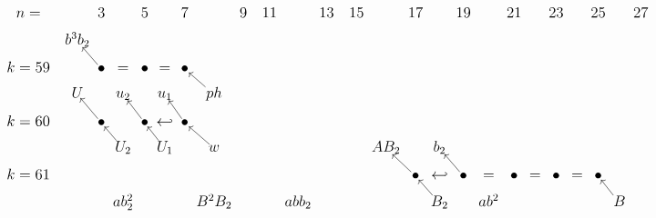 \documentclass{article}
\begin{document}
\(
\begin{tikzcd}[
nodes={font=\large,inner sep=0.2pt},
row sep=0.4cm,
column sep=0.2cm
]
n=& && 3 & & 5 & & 7 & & 9 & & 11 & & 13 & & 15 & & 17 & & 19 & & 21 & & 23 && 25 && 27 \\
&& b^3b_2 && && \\
k=59& && \bullet\arrow[lu] &=& \bullet &=& \bullet \\
&& U && u_2 && u_1 && ph\arrow[lu] && && && && && && && && \\
k=60& && \bullet\arrow[lu] && \bullet\arrow[lu] &\hookleftarrow& \bullet\arrow[lu] &&  \\
&& && U_2\arrow[lu] && U_1\arrow[lu] && w\arrow[lu] && && && && AB_2 && b_2 && && && && \\ 
k=61& && && && && && && && && \bullet\arrow[lu] & \hookleftarrow & \bullet\arrow[lu] &=& \bullet &=& \bullet &=& \bullet \\
&& && ab_2^2 && && B^2B_2 && && abb_2 && && && B_2\arrow[lu] && ab^2 && && && B\arrow[lu] \\
\end{tikzcd}
\)
\end{document}
